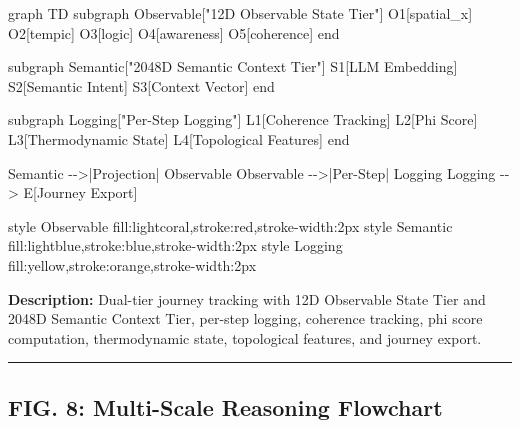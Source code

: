 \documentclass[
  letterpaper,
  DIV=11,
  numbers=noendperiod]{scrartcl}
\newenvironment{Shaded}{\begin{snugshade}}{\end{snugshade}}
\newcommand{\NormalTok}[1]{\textcolor[rgb]{0.00,0.23,0.31}{#1}}
\begin{document}
\begin{Shaded}
\begin{Highlighting}[]
\NormalTok{graph TD}
\NormalTok{    subgraph Observable["12D Observable State Tier"]}
\NormalTok{        O1[spatial\_x]}
\NormalTok{        O2[tempic]}
\NormalTok{        O3[logic]}
\NormalTok{        O4[awareness]}
\NormalTok{        O5[coherence]}
\NormalTok{    end}
    
\NormalTok{    subgraph Semantic["2048D Semantic Context Tier"]}
\NormalTok{        S1[LLM Embedding]}
\NormalTok{        S2[Semantic Intent]}
\NormalTok{        S3[Context Vector]}
\NormalTok{    end}
    
\NormalTok{    subgraph Logging["Per{-}Step Logging"]}
\NormalTok{        L1[Coherence Tracking]}
\NormalTok{        L2[Phi Score]}
\NormalTok{        L3[Thermodynamic State]}
\NormalTok{        L4[Topological Features]}
\NormalTok{    end}
    
\NormalTok{    Semantic {-}{-}\textgreater{}|Projection| Observable}
\NormalTok{    Observable {-}{-}\textgreater{}|Per{-}Step| Logging}
\NormalTok{    Logging {-}{-}\textgreater{} E[Journey Export]}
    
\NormalTok{    style Observable fill:lightcoral,stroke:red,stroke{-}width:2px}
\NormalTok{    style Semantic fill:lightblue,stroke:blue,stroke{-}width:2px}
\NormalTok{    style Logging fill:yellow,stroke:orange,stroke{-}width:2px}
\end{Highlighting}
\end{Shaded}

\textbf{Description:} Dual-tier journey tracking with 12D Observable
State Tier and 2048D Semantic Context Tier, per-step logging, coherence
tracking, phi score computation, thermodynamic state, topological
features, and journey export.

\begin{center}\rule{0.5\linewidth}{0.5pt}\end{center}

\subsection{FIG. 8: Multi-Scale Reasoning
Flowchart}\label{fig.-8-multi-scale-reasoning-flowchart}
\end{document}
